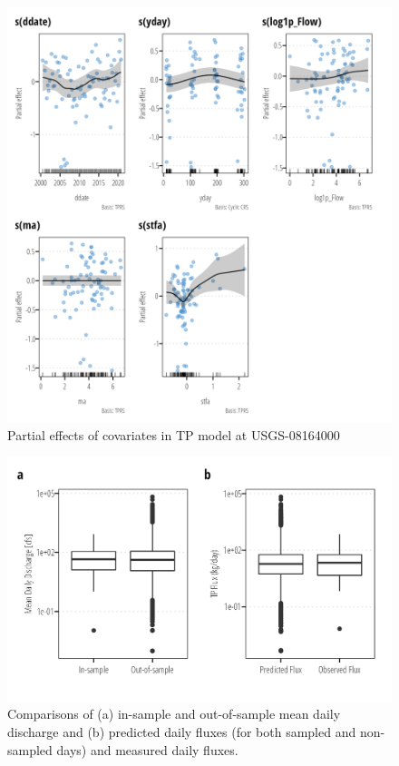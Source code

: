 \documentclass[
]{article}
\begin{document}
\begin{figure}[h]

{\centering \includegraphics{model_assessment_files/figure-pdf/unnamed-chunk-11-1.png}

}

\caption{Partial effects of covariates in TP model at USGS-08164000}

\end{figure}

\begin{figure}[h]

{\centering \includegraphics{model_assessment_files/figure-pdf/unnamed-chunk-12-1.png}

}

\caption{Comparisons of (a) in-sample and out-of-sample mean daily
discharge and (b) predicted daily fluxes (for both sampled and
non-sampled days) and measured daily fluxes.}

\end{figure}
\end{document}
